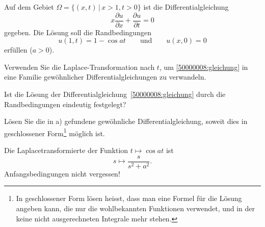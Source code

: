 Auf dem Gebiet $\Omega=\{(x,t)\,|\, x>1,t > 0\}$
ist die Differentialgleichung
\begin{equation}
x\frac{\partial u}{\partial x}+\frac{\partial u}{\partial t}=0
\label{50000008:gleichung}
\end{equation}
gegeben. Die Lösung soll die Randbedingungen
\[
u(1,t)=1-\cos at
\qquad
\text{und}
\qquad
u(x,0)=0
\]
erfüllen ($a > 0$).
\begin{teilaufgaben}
\item Verwenden Sie die Laplace-Transformation nach $t$,
um \eqref{50000008:gleichung} in eine Familie gewöhnlicher
Differentialgleichungen zu verwandeln.
\item 
Ist die Lösung der Differentialgleichung~\eqref{50000008:gleichung} durch
die Randbedingungen eindeutig festgelegt?
\item
Lösen Sie die in a) gefundene gewöhnliche Differentialgleichung,
soweit dies in ge\-schlos\-se\-ner Form\footnote{In geschlossener Form
lösen heisst, dass man eine Formel für die Lösung angeben kann, die 
nur die wohlbekannten Funktionen verwendet, und in der keine nicht
ausgerechneten Integrale mehr stehen.
} möglich ist.
\end{teilaufgaben}

\begin{hinweis}
Die Laplacetransformierte der Funktion $t\mapsto\cos at$ ist
\[
s\mapsto
\frac{s}{s^2+a^2}.
\]
Anfangsbedingungen nicht vergessen!
\end{hinweis}


